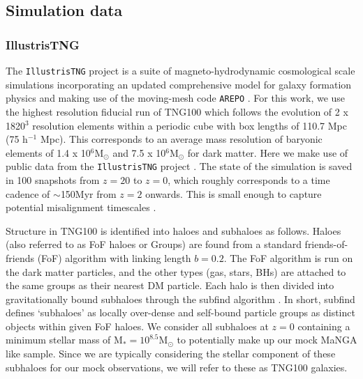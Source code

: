 \subsection{Simulation data} \label{sec:sim_data_TNG}
\subsubsection{IllustrisTNG} 
The \texttt{IllustrisTNG} project \citep{marinacci18,naiman18,nelson18,pillepich18b,springel18} is a suite of magneto-hydrodynamic cosmological scale simulations incorporating an updated comprehensive model for galaxy formation physics \citep[as decribed in][]{weinberger17,pillepich18a} and making use of the moving-mesh code \texttt{AREPO} \citep{springel10,pakmor11,pakmor13}. For this work, we use the highest resolution fiducial run of TNG100 which follows the evolution of 2 x 1820$^3$ resolution elements within a periodic cube with box lengths of 110.7 Mpc (75 h$^{-1}$ Mpc). This corresponds to an average mass resolution of baryonic elements of 1.4 x 10$^6 \mathrm{M_{\odot}}$ and 7.5 x 10$^6 \mathrm{M_{\odot}}$ for dark matter. Here we make use of public data from the \texttt{IllustrisTNG} project \citep[as described in][]{nelson2019}. The state of the simulation is saved in 100 snapshots from $z=20$ to $z=0$, which roughly corresponds to a time cadence of $\sim$150Myr from $z=2$ onwards. This is small enough to capture potential misalignment timescales \citep[e.g. 1-5Gyr in ][]{davis2016}.

Structure in TNG100 is identified into haloes and subhaloes as follows. Haloes (also referred to as FoF haloes or Groups) are found from a standard friends-of-friends (FoF) algorithm \citep{davis85} with linking length $b=0.2$. The FoF algorithm is run on the dark matter particles, and the other types (gas, stars, BHs) are attached to the same groups as their nearest DM particle. Each halo is then divided into gravitationally bound subhaloes through the subfind algorithm \citep{springel01}. In short, subfind defines `subhaloes' as locally over-dense and self-bound particle groups as distinct objects within given FoF haloes. We consider all subhaloes at $z=0$ containing a minimum stellar mass of $\mathrm{M_{\ast}} = 10^{8.5} \mathrm{M_{\odot}}$ to potentially make up our mock MaNGA like sample. Since we are typically considering the stellar component of these subhaloes for our mock observations, we will refer to these as TNG100 galaxies.

